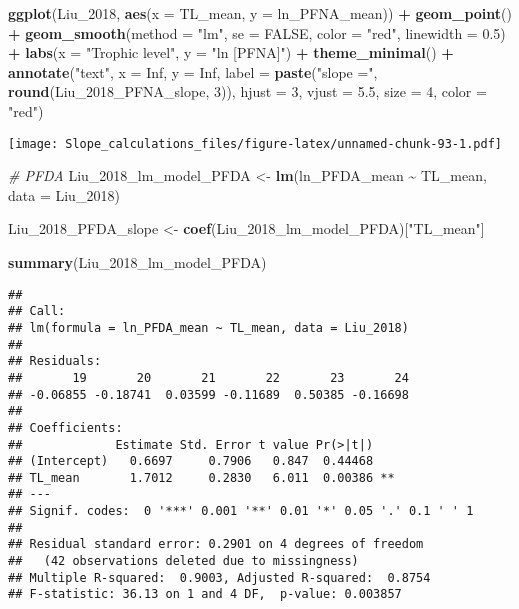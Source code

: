 \documentclass[
]{article}
\newenvironment{Shaded}{\begin{snugshade}}{\end{snugshade}}
\newcommand{\AttributeTok}[1]{\textcolor[rgb]{0.13,0.29,0.53}{#1}}
\newcommand{\CommentTok}[1]{\textcolor[rgb]{0.56,0.35,0.01}{\textit{#1}}}
\newcommand{\ConstantTok}[1]{\textcolor[rgb]{0.56,0.35,0.01}{#1}}
\newcommand{\DecValTok}[1]{\textcolor[rgb]{0.00,0.00,0.81}{#1}}
\newcommand{\FloatTok}[1]{\textcolor[rgb]{0.00,0.00,0.81}{#1}}
\newcommand{\FunctionTok}[1]{\textcolor[rgb]{0.13,0.29,0.53}{\textbf{#1}}}
\newcommand{\NormalTok}[1]{#1}
\newcommand{\OtherTok}[1]{\textcolor[rgb]{0.56,0.35,0.01}{#1}}
\newcommand{\SpecialCharTok}[1]{\textcolor[rgb]{0.81,0.36,0.00}{\textbf{#1}}}
\newcommand{\StringTok}[1]{\textcolor[rgb]{0.31,0.60,0.02}{#1}}
\begin{document}
\begin{Shaded}
\begin{Highlighting}[]
\FunctionTok{ggplot}\NormalTok{(Liu\_2018, }\FunctionTok{aes}\NormalTok{(}\AttributeTok{x =}\NormalTok{ TL\_mean, }\AttributeTok{y =}\NormalTok{ ln\_PFNA\_mean)) }\SpecialCharTok{+}
  \FunctionTok{geom\_point}\NormalTok{() }\SpecialCharTok{+}
  \FunctionTok{geom\_smooth}\NormalTok{(}\AttributeTok{method =} \StringTok{"lm"}\NormalTok{, }\AttributeTok{se =} \ConstantTok{FALSE}\NormalTok{, }\AttributeTok{color =} \StringTok{"red"}\NormalTok{, }\AttributeTok{linewidth =} \FloatTok{0.5}\NormalTok{) }\SpecialCharTok{+}
  \FunctionTok{labs}\NormalTok{(}\AttributeTok{x =} \StringTok{"Trophic level"}\NormalTok{,}
       \AttributeTok{y =} \StringTok{"ln [PFNA]"}\NormalTok{) }\SpecialCharTok{+}
  \FunctionTok{theme\_minimal}\NormalTok{() }\SpecialCharTok{+}
  \FunctionTok{annotate}\NormalTok{(}\StringTok{"text"}\NormalTok{, }\AttributeTok{x =} \ConstantTok{Inf}\NormalTok{, }\AttributeTok{y =} \ConstantTok{Inf}\NormalTok{, }\AttributeTok{label =} \FunctionTok{paste}\NormalTok{(}\StringTok{"slope ="}\NormalTok{, }\FunctionTok{round}\NormalTok{(Liu\_2018\_PFNA\_slope, }\DecValTok{3}\NormalTok{)), }
           \AttributeTok{hjust =} \DecValTok{3}\NormalTok{, }\AttributeTok{vjust =} \FloatTok{5.5}\NormalTok{, }\AttributeTok{size =} \DecValTok{4}\NormalTok{, }\AttributeTok{color =} \StringTok{"red"}\NormalTok{)}
\end{Highlighting}
\end{Shaded}

\texttt{[image: Slope\_calculations\_files/figure-latex/unnamed-chunk-93-1.pdf]}

\begin{Shaded}
\begin{Highlighting}[]
\CommentTok{\# PFDA}
\NormalTok{Liu\_2018\_lm\_model\_PFDA }\OtherTok{\textless{}{-}} \FunctionTok{lm}\NormalTok{(ln\_PFDA\_mean }\SpecialCharTok{\textasciitilde{}}\NormalTok{ TL\_mean,}
                             \AttributeTok{data =}\NormalTok{ Liu\_2018)}

\NormalTok{Liu\_2018\_PFDA\_slope }\OtherTok{\textless{}{-}} \FunctionTok{coef}\NormalTok{(Liu\_2018\_lm\_model\_PFDA)[}\StringTok{"TL\_mean"}\NormalTok{]}

\FunctionTok{summary}\NormalTok{(Liu\_2018\_lm\_model\_PFDA)}
\end{Highlighting}
\end{Shaded}

\begin{verbatim}
## 
## Call:
## lm(formula = ln_PFDA_mean ~ TL_mean, data = Liu_2018)
## 
## Residuals:
##       19       20       21       22       23       24 
## -0.06855 -0.18741  0.03599 -0.11689  0.50385 -0.16698 
## 
## Coefficients:
##             Estimate Std. Error t value Pr(>|t|)   
## (Intercept)   0.6697     0.7906   0.847  0.44468   
## TL_mean       1.7012     0.2830   6.011  0.00386 **
## ---
## Signif. codes:  0 '***' 0.001 '**' 0.01 '*' 0.05 '.' 0.1 ' ' 1
## 
## Residual standard error: 0.2901 on 4 degrees of freedom
##   (42 observations deleted due to missingness)
## Multiple R-squared:  0.9003, Adjusted R-squared:  0.8754 
## F-statistic: 36.13 on 1 and 4 DF,  p-value: 0.003857
\end{verbatim}
\end{document}
